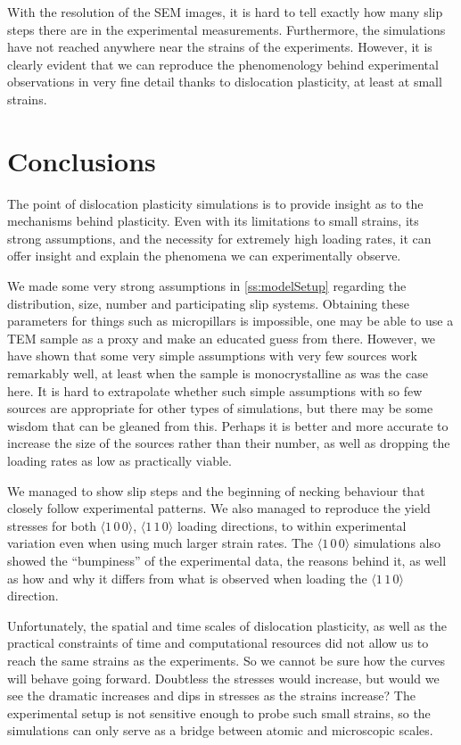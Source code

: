 With the resolution of the SEM images, it is hard to tell exactly how many slip steps there are in the experimental measurements. Furthermore, the simulations have not reached anywhere near the strains of the experiments. However, it is clearly evident that we can reproduce the phenomenology behind experimental observations in very fine detail thanks to dislocation plasticity, at least at small strains.

\section{Conclusions}
\label{s:concSim}

The point of dislocation plasticity simulations is to provide insight as to the mechanisms behind plasticity. Even with its limitations to small strains, its strong assumptions, and the necessity for extremely high loading rates, it can offer insight and explain the phenomena we can experimentally observe.

We made some very strong assumptions in \cref{ss:modelSetup} regarding the distribution, size, number and participating slip systems. Obtaining these parameters for things such as micropillars is impossible, one may be able to use a TEM sample as a proxy and make an educated guess from there. However, we have shown that some very simple assumptions with very few sources work remarkably well, at least when the sample is monocrystalline as was the case here. It is hard to extrapolate whether such simple assumptions with so few sources are appropriate for other types of simulations, but there may be some wisdom that can be gleaned from this. Perhaps it is better and more accurate to increase the size of the sources rather than their number, as well as dropping the loading rates as low as practically viable.

We managed to show slip steps and the beginning of necking behaviour that closely follow experimental patterns. We also managed to reproduce the yield stresses for both $\langle 1\, 0\, 0 \rangle$, $\langle 1\, 1\, 0 \rangle$ loading directions, to within experimental variation even when using much larger strain rates. The $\langle 1\, 0\, 0 \rangle$ simulations also showed the ``bumpiness'' of the experimental data, the reasons behind it, as well as how and why it differs from what is observed when loading the $\langle 1\, 1\, 0 \rangle$ direction.

Unfortunately, the spatial and time scales of dislocation plasticity, as well as the practical constraints of time and computational resources did not allow us to reach the same strains as the experiments. So we cannot be sure how the curves will behave going forward. Doubtless the stresses would increase, but would we see the dramatic increases and dips in stresses as the strains increase? The experimental setup is not sensitive enough to probe such small strains, so the simulations can only serve as a bridge between atomic and microscopic scales.

